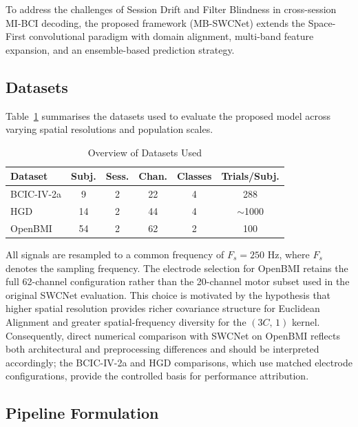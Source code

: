 \documentclass[conference]{IEEEtran}
\begin{document}
To address the challenges of Session Drift and Filter Blindness in cross-session MI-BCI decoding, the proposed framework (MB-SWCNet) extends the Space-First convolutional paradigm with domain alignment, multi-band feature expansion, and an ensemble-based prediction strategy.

\subsection{Datasets}

Table~\ref{tab:datasets} summarises the datasets used to evaluate the proposed model across varying spatial resolutions and population scales.

\begin{table}[t]
\caption{Overview of Datasets Used}
\begin{center}
\begin{tabular}{|l|c|c|c|c|c|}
\hline
\textbf{Dataset} & \textbf{Subj.} & \textbf{Sess.} & \textbf{Chan.} & \textbf{Classes} & \textbf{Trials/Subj.} \\
\hline
BCIC-IV-2a \cite{b17} & 9 & 2 & 22 & 4 & 288 \\
\hline
HGD \cite{b9} & 14 & 2 & 44 & 4 & $\sim$1000 \\
\hline
OpenBMI \cite{b18} & 54 & 2 & 62 & 2 & 100 \\
\hline
\end{tabular}
\label{tab:datasets}
\end{center}
\end{table}

All signals are resampled to a common frequency of $F_s = 250$ Hz, where $F_s$ denotes the sampling frequency. The electrode selection for OpenBMI retains the full 62-channel configuration rather than the 20-channel motor subset used in the original SWCNet evaluation. This choice is motivated by the hypothesis that higher spatial resolution provides richer covariance structure for Euclidean Alignment and greater spatial-frequency diversity for the $(3C,\,1)$ kernel. Consequently, direct numerical comparison with SWCNet on OpenBMI reflects both architectural and preprocessing differences and should be interpreted accordingly; the BCIC-IV-2a and HGD comparisons, which use matched electrode configurations, provide the controlled basis for performance attribution.

\subsection{Pipeline Formulation}
\end{document}
